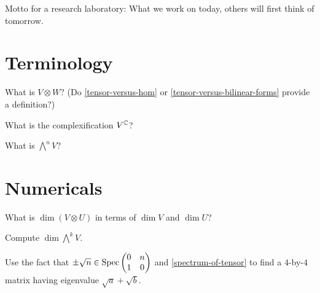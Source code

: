 \documentclass{homework}
\author{Jim Fowler}
\begin{document}
\maketitle

\begin{inspiration}
  Motto for a research laboratory: What we work on today, others will first think of tomorrow.
\end{inspiration}

\section{Terminology}

\begin{problem}
  What is $V \otimes W$?  (Do \ref{tensor-versus-hom} or
  \ref{tensor-versus-bilinear-forms} provide a definition?)
\end{problem}

\begin{problem}
  What is the complexification $V^{\mathbb{C}}$?
\end{problem}

\begin{problem}
  What is $\bigwedge^n V$?
\end{problem}


\section{Numericals}

\begin{problem}
  What is $\dim (V \otimes U)$ in terms of $\dim V$ and $\dim U$?
\end{problem}

\begin{problem}
  Compute $\dim \bigwedge^k V$. %
\end{problem}

\begin{problem}
  Use the fact that $\pm \sqrt{n} \in \operatorname{Spec} \begin{pmatrix} 0 & n \\ 1 & 0 \end{pmatrix}$ and \ref{spectrum-of-tensor} to find a $4$-by-$4$ matrix having eigenvalue $\sqrt{a} + \sqrt{b}$.
\end{problem}
\end{document}
